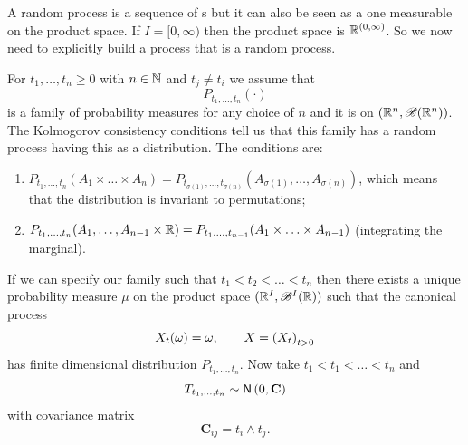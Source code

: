 \documentclass[12pt]{report}
\begin{document}
A random process is a sequence of \rv s but it can also be seen as a one \rv{} measurable on the product space. If $I=[0,\infty)$ then the product space is $\mathbb{R}^{(0,\infty)}$. So we now need to explicitly build a process that is a random process.
\begin{theorem}
	For $t_{1},\ldots,t_{n}\geq0$ with $n\in\mathbb{N}$ and $t_{j}\neq t_{i}$ we assume that 
	\begin{equation*}
		P_{t_{1},\ldots,t_{n}}(\cdot)
	\end{equation*}
	is a family of probability measures for any choice of $n$ and it is on $\left(\mathbb{R}^{n},\mathscr{B}(\mathbb{R}^{n})\right)$.
The Kolmogorov consistency conditions tell us that this family has a random process having this as a distribution. The conditions are:
\begin{enumerate}
	\item $P_{t_{1},\ldots,t_{n}}(A_{1}\times\ldots\times A_{n})=P_{t_{\sigma(1)},\ldots,t_{\sigma(n)}}(A_{\sigma(1)},\ldots,A_{\sigma(n)})$, which means that the distribution is invariant to permutations;
	\item $P_{t_{1},\ldots,t_{n}}(A_{1},\ldots,A_{n-1}\times \mathbb{R})=P_{t_{1},\ldots,t_{n-1}}(A_{1}\times\ldots\times A_{n-1})$ (integrating the marginal).
\end{enumerate}
If we can specify our family such that $t_{1}<t_{2}<\ldots<t_{n}$ then there exists a unique probability measure $\mu$ on the product space $(\mathbb{R}^{I},\mathscr{B}^{I}(\mathbb{R}))$ such that the canonical process
\begin{equation*}
	X_{t}(\omega)=\omega,\qquad X={\left({X}_{t}\right)}_{t>0}
\end{equation*}
has finite dimensional distribution $P_{t_{1},\ldots,t_{n}}$. Now take $t_{1}<t_{1}<\ldots<t_{n}$ and 
\begin{equation*}
	T_{t_{1},\ldots,t_{n}}\sim\mathsf{N}\left(0,\mathbf{C}\right)
\end{equation*}
with covariance matrix
\begin{equation*}
	\mathbf{C}_{ij}=t_{i}\wedge t_{j}.
\end{equation*}
\end{theorem}
\end{document}
